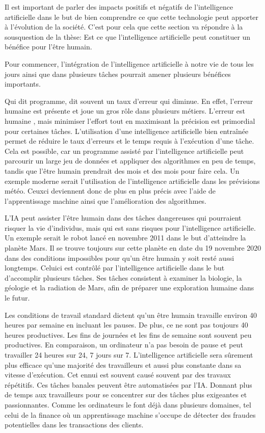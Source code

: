 \documentclass[letterpaper,10pt,french]{sphinxmanual}
\begin{document}
Il est important de parler des impacts positifs et négatifs de l’intelligence
artificielle dans le but de bien comprendre ce que cette technologie peut apporter
à l’évolution de la société. C’est pour cela que cette section va répondre à la
sous\sphinxhyphen{}question de la thèse: Est\sphinxhyphen{} ce que l’intelligence artificielle peut constituer
un bénéfice pour l’être humain.

Pour commencer, l’intégration de l’intelligence artificielle à notre vie de tous
les jours ainsi que dans plusieurs tâches pourrait amener plusieurs bénéfices
importants.

Qui dit programme, dit souvent un taux d’erreur qui diminue. En effet, l’erreur
humaine est présente et joue un gros rôle dans plusieurs métiers. L’erreur est humaine
, mais minimiser l’effort tout en maximisant la précision est primordial pour
certaines tâches. L’utilisation d’une intelligence artificielle bien entraînée
permet de réduire le taux d’erreurs et le temps requis à l’exécution d’une tâche.
Cela est possible, car un programme assisté par l’intelligence artificielle peut
parcourir un large jeu de données et appliquer des algorithmes en peu de temps,
tandis que l’être humain prendrait des mois et des mois pour faire cela. Un exemple
moderne serait l’utilisation de l’intelligence artificielle dans les prévisions météo.
Ceux\sphinxhyphen{}ci deviennent donc de plus en plus précis avec l’aide de l’apprentissage
machine ainsi que l’amélioration des algorithmes.

L’IA peut assister l’être humain dans des tâches dangereuses qui pourraient risquer
la vie d’individus, mais qui est sans risques pour l’intelligence artificielle.
Un exemple serait le robot  lancé en novembre 2011 dans le but d’atteindre
la planète Mars. Il se trouve toujours sur cette planète en date du 19 novembre
2020 dans des conditions impossibles pour qu’un être humain y soit resté aussi
longtemps. Celui\sphinxhyphen{}ci est contrôlé par l’intelligence artificielle dans le but
d’accomplir plusieurs tâches. Ses tâches consistent à examiner la biologie, la
géologie  et la radiation de Mars, afin de préparer une exploration humaine dans le futur.

Les conditions de travail standard dictent qu’un être humain travaille environ
40 heures par semaine en incluant les pauses. De plus, ce ne sont pas toujours
40 heures productives. Les fins de journées et les fins de semaine sont souvent
peu productives. En comparaison, un ordinateur n’a pas besoin de pause et peut
travailler 24 heures sur 24, 7 jours sur 7. L’intelligence artificielle sera
sûrement plus efficace qu’une majorité des travailleurs  et  aussi plus constante
dans sa vitesse d’exécution. Cet ennui est souvent causé souvent par des travaux
répétitifs. Ces tâches banales peuvent être automatisées par l’IA. Donnant plus de
temps aux travailleurs pour se concentrer sur des tâches plus exigeantes et passionnantes.
Comme les ordinateurs le font déjà dans plusieurs domaines, tel celui de la finance
où un apprentissage machine s’occupe de détecter des fraudes potentielles dans
les transactions des clients.
\end{document}
